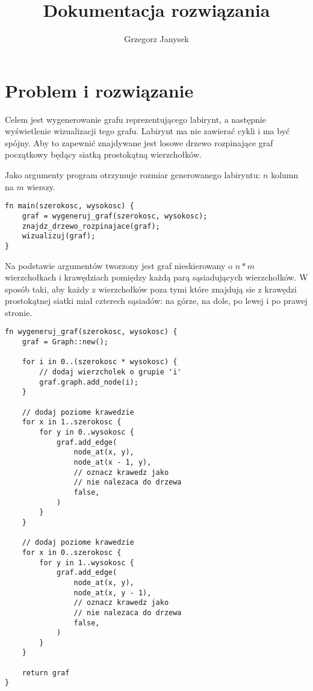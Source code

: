 \documentclass[twocolumn]{article}
\author{Grzegorz Janysek}
\title{Dokumentacja rozwiązania}
\begin{document}
\maketitle

\section{Problem i rozwiązanie}
Celem jest wygenerowanie grafu reprezentującego labirynt, a następnie wyświetlenie wizualizacji tego grafu.
Labirynt ma nie zawierać cykli i ma być spójny.
Aby to zapewnić znajdywane jest losowe drzewo rozpinające graf początkowy będący siatką prostokątną wierzchołków.

Jako argumenty program otrzymuje rozmiar generowanego labiryntu: \(n\) kolumn na \(m\) wierszy.
\begin{lstlisting}
fn main(szerokosc, wysokosc) {
	graf = wygeneruj_graf(szerokosc, wysokosc);
	znajdz_drzewo_rozpinajace(graf);
	wizualizuj(graf);
}
\end{lstlisting}

Na podstawie argumentów tworzony jest graf nieskierowany o \(n*m\) wierzchołkach i krawędziach pomiędzy każdą parą sąsiadujących wierzchołków.
W sposób taki, aby każdy z wierzchołków poza tymi które znajdują sie z krawędzi prostokątnej siatki miał czterech sąsiadów: na górze, na dole, po lewej i po prawej stronie.
\begin{lstlisting}
fn wygeneruj_graf(szerokosc, wysokosc) {
	graf = Graph::new();

	for i in 0..(szerokosc * wysokosc) {
		// dodaj wierzcholek o grupie 'i'
		graf.graph.add_node(i);
	}

	// dodaj poziome krawedzie
	for x in 1..szerokosc {
		for y in 0..wysokosc {
			graf.add_edge(
				node_at(x, y),
				node_at(x - 1, y),
				// oznacz krawedz jako
				// nie nalezaca do drzewa
				false,
			)
		}
	}

	// dodaj poziome krawedzie
	for x in 0..szerokosc {
		for y in 1..wysokosc {
			graf.add_edge(
				node_at(x, y),
				node_at(x, y - 1),
				// oznacz krawedz jako
				// nie nalezaca do drzewa
				false,
			)
		}
	}

	return graf
}
\end{lstlisting}
\end{document}
